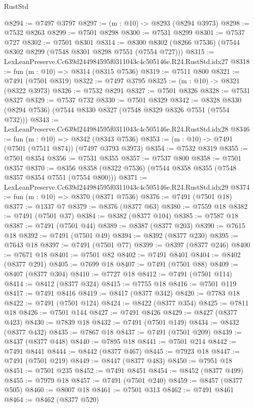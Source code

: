 \begin{lexlean}{RustStd}
\begin{coremodule}
@8294 := @7497 @3797
@8297 := (m : @10) -> @8293 (@8294 @3973)
@8298 := @7532 @8263
@8299 := @7501 @8298
@8300 := @7531 @8299
@8301 := @7537 @727
@8302 := @7501 @8301
@8314 := @8300 @8302 (@8266 @7536) (@7544 @8302 @8299 (@7548 @8301 @8298 @7551 (@7554 @727)))
@8315 := LexLeanPreserve.Cc639d244984595f0311043c4c505146e.R24.RustStd.idx27
@8318 := fun (m : @10) => @8314 (@8315 @7536)
@8319 := @7511 @800
@8321 := @7491 (@7501 @8319)
@8322 := @7497 @3795
@8325 := (m : @10) -> @8321 (@8322 @3973)
@8326 := @7532 @8291
@8327 := @7501 @8326
@8328 := @7531 @8327
@8329 := @7537 @732
@8330 := @7501 @8329
@8342 := @8328 @8330 (@8294 @7536) (@7544 @8330 @8327 (@7548 @8329 @8326 @7551 (@7554 @732)))
@8343 := LexLeanPreserve.Cc639d244984595f0311043c4c505146e.R24.RustStd.idx28
@8346 := fun (m : @10) => @8342 (@8343 @7536)
@8353 := (m : @10) -> @7491 (@7501 (@7511 @874)) (@7497 @3793 @3973)
@8354 := @7532 @8319
@8355 := @7501 @8354
@8356 := @7531 @8355
@8357 := @7537 @800
@8358 := @7501 @8357
@8370 := @8356 @8358 (@8322 @7536) (@7544 @8358 @8355 (@7548 @8357 @8354 @7551 (@7554 @800)))
@8371 := LexLeanPreserve.Cc639d244984595f0311043c4c505146e.R24.RustStd.idx29
@8374 := fun (m : @10) => @8370 (@8371 @7536)
@8376 := @7491 (@7501 @18)
@8377 := @1337 @7
@8379 := @8376 (@8377 @63)
@8380 := @7559 @18
@8382 := @7491 (@7501 @37)
@8384 := @8382 (@8377 @104)
@8385 := @7587 @18
@8387 := @7491 (@7501 @44)
@8389 := @8387 (@8377 @203)
@8390 := @7615 @18
@8392 := @7491 (@7501 @49)
@8394 := @8392 (@8377 @230)
@8395 := @7643 @18
@8397 := @7491 (@7501 @77)
@8399 := @8397 (@8377 @246)
@8400 := @7671 @18
@8401 := @7501 @82
@8402 := @7491 @8401
@8404 := @8402 (@8377 @291)
@8405 := @7699 @18
@8407 := @7491 (@7501 @88)
@8409 := @8407 (@8377 @304)
@8410 := @7727 @18
@8412 := @7491 (@7501 @114)
@8414 := @8412 (@8377 @324)
@8415 := @7755 @18
@8416 := @7501 @119
@8417 := @7491 @8416
@8419 := @8417 (@8377 @342)
@8420 := @7783 @18
@8422 := @7491 (@7501 @124)
@8424 := @8422 (@8377 @354)
@8425 := @7811 @18
@8426 := @7501 @144
@8427 := @7491 @8426
@8429 := @8427 (@8377 @423)
@8430 := @7839 @18
@8432 := @7491 (@7501 @149)
@8434 := @8432 (@8377 @432)
@8435 := @7867 @18
@8437 := @7491 (@7501 @209)
@8439 := @8437 (@8377 @448)
@8440 := @7895 @18
@8441 := @7501 @214
@8442 := @7491 @8441
@8444 := @8442 (@8377 @467)
@8445 := @7923 @18
@8447 := @7491 (@7501 @219)
@8449 := @8447 (@8377 @483)
@8450 := @7951 @18
@8451 := @7501 @235
@8452 := @7491 @8451
@8454 := @8452 (@8377 @499)
@8455 := @7979 @18
@8457 := @7491 (@7501 @240)
@8459 := @8457 (@8377 @505)
@8460 := @8007 @18
@8461 := @7501 @313
@8462 := @7491 @8461
@8464 := @8462 (@8377 @520)

\end{coremodule}
\end{lexlean}
